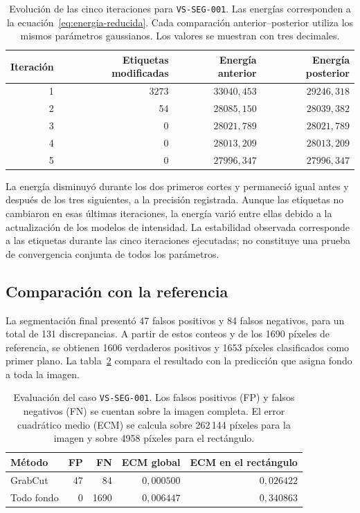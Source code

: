 \begin{table}[!htbp]
 \centering
 \caption{Evolución de las cinco iteraciones para \texttt{VS-SEG-001}.
 Las energías corresponden a la ecuación~\eqref{eq:energia-reducida}.
 Cada comparación anterior--posterior utiliza los mismos parámetros
 gaussianos. Los valores se muestran con tres decimales.}
 \label{tab:iteraciones}
 \begin{tabular}{rrrr}
 \toprule
 Iteración & Etiquetas modificadas & Energía anterior & Energía posterior \\
 \midrule
 1 & 3273 & $33040{,}453$ & $29246{,}318$ \\
 2 & 54   & $28085{,}150$ & $28039{,}382$ \\
 3 & 0    & $28021{,}789$ & $28021{,}789$ \\
 4 & 0    & $28013{,}209$ & $28013{,}209$ \\
 5 & 0    & $27996{,}347$ & $27996{,}347$ \\
 \bottomrule
 \end{tabular}
\end{table}

La energía disminuyó durante los dos primeros cortes y permaneció igual
antes y después de los tres siguientes, a la precisión registrada.
Aunque las etiquetas no cambiaron en esas últimas iteraciones, la energía
varió entre ellas debido a la actualización de los modelos de intensidad.
La estabilidad observada corresponde a las etiquetas durante las cinco
iteraciones ejecutadas; no constituye una prueba de convergencia conjunta
de todos los parámetros.

\subsection{Comparación con la referencia}

La segmentación final presentó 47 falsos positivos y 84 falsos negativos,
para un total de 131 discrepancias. A partir de estos conteos y de los
1690 píxeles de referencia, se obtienen 1606 verdaderos positivos y 1653
píxeles clasificados como primer plano. La tabla~\ref{tab:evaluacion-caso}
compara el resultado con la predicción que asigna fondo a toda la imagen.

\begin{table}[!htbp]
 \centering
 \caption{Evaluación del caso \texttt{VS-SEG-001}. Los falsos positivos
 (FP) y falsos negativos (FN) se cuentan sobre la imagen completa.
 El error cuadrático medio (ECM) se calcula sobre 262\,144 píxeles para
 la imagen y sobre 4958 píxeles para el rectángulo.}
 \label{tab:evaluacion-caso}
 \begin{tabular}{lrrrr}
 \toprule
 Método & FP & FN & ECM global & ECM en el rectángulo \\
 \midrule
 GrabCut & 47 & 84 & $0{,}000500$ & $0{,}026422$ \\
 Todo fondo & 0 & 1690 & $0{,}006447$ & $0{,}340863$ \\
 \bottomrule
 \end{tabular}
\end{table}


